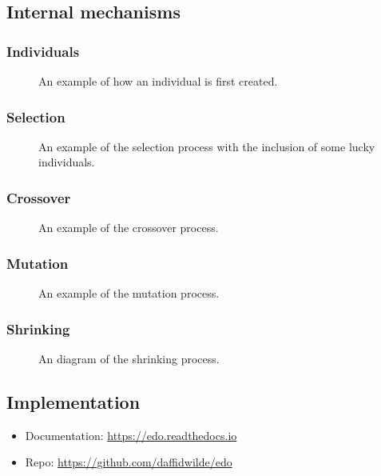 \documentclass[10pt]{article}
\newlength{\imgwidth}
\newcommand{\inputtikz}[3][\imgwidth]{%
    \begin{figure}[htbp]
        \centering
        \resizebox{#1}{!}{%
            
        }
        \caption{#3}
    \end{figure}
}
\begin{document}
\subsection{Internal mechanisms}\label{subsection:mechanisms}

\subsubsection{Individuals}

\inputtikz{individual.tex}{%
    An example of how an individual is first created.
}

\subsubsection{Selection}

\inputtikz{selection.tex}{%
    An example of the selection process with the inclusion of some lucky
    individuals.
}

\subsubsection{Crossover}

\inputtikz{crossover.tex}{An example of the crossover process.}

\subsubsection{Mutation}

\inputtikz{mutation.tex}{An example of the mutation process.}

\subsubsection{Shrinking}

\inputtikz{shrinking.tex}{An diagram of the shrinking process.}

\subsection{Implementation}\label{subsection:implementation}

\begin{itemize}
    \item Documentation: \url{https://edo.readthedocs.io}
    \item Repo: \url{https://github.com/daffidwilde/edo}
\end{itemize}
\end{document}
